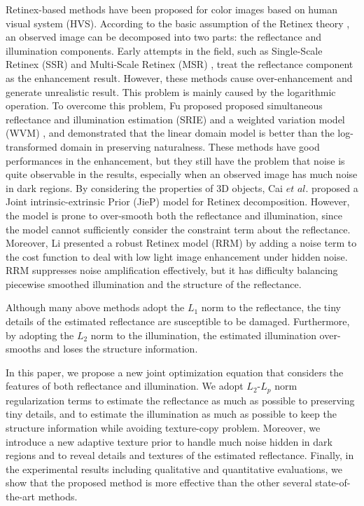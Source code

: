 Retinex-based methods have been proposed for color images based on human visual system (HVS). 
According to the basic assumption of the Retinex theory \cite{retinex}, an observed image can be decomposed into two parts: the reflectance and illumination components. 
Early attempts in the field, such as Single-Scale Retinex (SSR) \cite{ssr} and Multi-Scale Retinex (MSR) \cite{msr}, treat the reflectance component as the enhancement result. 
However, these methods cause over-enhancement and generate unrealistic result. This problem is mainly caused by the logarithmic operation.
To overcome this problem, Fu proposed proposed simultaneous reflectance and illumination estimation (SRIE) \cite{srie} and a weighted variation model (WVM) \cite{wvm}, and demonstrated that the linear domain model is better than the log-transformed domain in preserving naturalness. 
These methods have good performances in the enhancement, but they still have the problem that noise is quite observable in the results, especially when an observed image has much noise in dark regions. 
By considering the properties of 3D objects, Cai $et$ $al$. \cite{jiep} proposed a Joint intrinsic-extrinsic Prior (JieP) model for Retinex decomposition. However, the model is prone to over-smooth both the reflectance and illumination, since the model cannot sufficiently consider the constraint term about the reflectance. 
Moreover, Li presented a robust Retinex model (RRM) \cite{rrm} by adding a noise term to the cost function to deal with low light image enhancement under hidden noise. RRM suppresses noise amplification effectively, but it has difficulty balancing piecewise smoothed illumination and the structure of the reflectance. 

Although many above methods adopt the $L_{1}$ norm to the reflectance, the tiny details of the estimated reflectance are susceptible to be damaged. Furthermore, by adopting the $L_{2}$ norm to the illumination, the estimated illumination over-smooths and loses the structure information.

In this paper, we propose a new joint optimization equation that considers the features of both reflectance and illumination. We adopt $L_{2}$-$L_{p}$ norm regularization terms to estimate the reflectance as much as possible to preserving tiny details, and to estimate the illumination as much as possible to keep the structure information while avoiding texture-copy problem. Moreover, we introduce a new adaptive texture prior to handle much noise hidden in dark regions and to reveal details and textures of the estimated reflectance. Finally, in the experimental results including qualitative and quantitative evaluations, we show that the proposed method is more effective than the other several state-of-the-art methods.\par